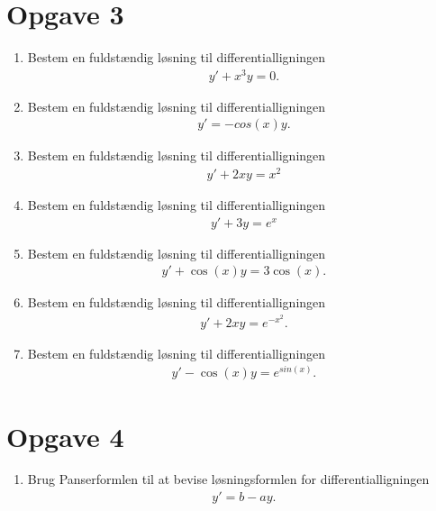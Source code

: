 \section*{Opgave 3}
\begin{enumerate}[label=\roman*)]
	\item Bestem en fuldstændig løsning til differentialligningen
	\begin{align*}
		y' + x^3y = 0.
	\end{align*}
	\item Bestem en fuldstændig løsning til differentialligningen
	\begin{align*}
		y'  = -cos(x)y.
	\end{align*}
	\item Bestem en fuldstændig løsning til differentialligningen 
	\begin{align*}
		y' + 2xy = x^2
	\end{align*}
	\item Bestem en fuldstændig løsning til differentialligningen
	\begin{align*}
		y' + 3y = e^x
	\end{align*}
	\item Bestem en fuldstændig løsning til differentialligningen
	\begin{align*}
		y' + \cos(x)y = 3\cos(x).
	\end{align*}
	\item Bestem en fuldstændig løsning til differentialligningen
	\begin{align*}
		y' + 2xy = e^{-x^2}.
	\end{align*}
	\item Bestem en fuldstændig løsning til differentialligningen
	\begin{align*}
		y' - \cos(x)y = e^{sin(x)}.
	\end{align*}
\end{enumerate}

\section*{Opgave 4}
\begin{enumerate}[label=\roman*)]
	\item Brug Panserformlen til at bevise løsningsformlen for differentialligningen
	\begin{align*}
		y' =b-ay.
	\end{align*}
\end{enumerate}